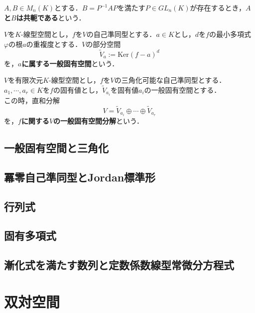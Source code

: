 \documentclass[uplatex, 12pt, dvipdfmx]{jsreport}
\begin{document}
\begin{definition}[conjugate]
    $A,B\in M_n(K)$とする．$B=P^{-1}AP$を満たす$P\in GL_n(K)$が存在するとき，\textbf{$A$と$B$は共軛である}という．
\end{definition}

\begin{definition}
    $V$を$K$-線型空間とし，$f$を$V$の自己準同型とする．$a\in K$とし，$d$を$f$の最小多項式$\varphi$の根$a$の重複度とする．$V$の部分空間
    $$\widetilde{V}_a:=\mathrm{Ker}(f-a)^d$$
    を，\textbf{$a$に属する一般固有空間}という．
\end{definition}

\begin{definition}
    $V$を有限次元$K$-線型空間とし，$f$を$V$の三角化可能な自己準同型とする．$a_1,\cdots,a_r\in K$を$f$の固有値とし，$\widetilde{V}_{a_i}$を固有値$a_i$の一般固有空間とする．\\ この時，直和分解
    $$V=\widetilde{V}_{a_i}\oplus\cdots\oplus\widetilde{V}_{a_r}$$
    を，\textbf{$f$に関する$V$の一般固有空間分解}という．
\end{definition}

\section{一般固有空間と三角化}

\section{冪零自己準同型とJordan標準形}

\section{行列式}

\section{固有多項式}

\section{漸化式を満たす数列と定数係数線型常微分方程式}

\chapter{双対空間}
\end{document}
